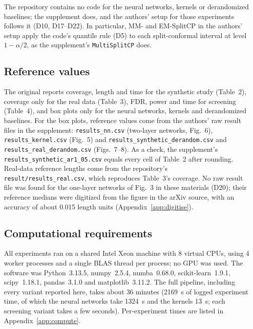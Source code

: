 The repository contains no code for the neural networks, kernels or derandomized baselines; the supplement does,
and the authors' setup for those experiments follows it (D10, D17--D22). In particular, MM- and EM-SplitCP in the
authors' setup apply the code's quantile rule (D5) to each split-conformal interval at level $1-\alpha/2$, as the
supplement's \texttt{MultiSplitCP} does.

\subsection{Reference values}

The original reports coverage, length and time for the synthetic study (Table~2), coverage only for the real data
(Table~3), FDR, power and time for screening (Table~4), and box plots only for the neural networks, kernels and
derandomized baselines. For the box plots, reference values come from the authors' raw result files in the
supplement\supercite{leezhang2025supp}: \texttt{results\_\allowbreak nn.csv} (two-layer networks, Fig.~6),
\texttt{results\_\allowbreak kernel.csv} (Fig.~5) and \texttt{results\_\allowbreak synthetic\_derandom.csv} and
\texttt{results\_\allowbreak real\_derandom.csv} (Figs.~7--8). As a check, the supplement's
\texttt{results\_\allowbreak synthetic\_ar1\_05.csv} equals every cell of Table~2 after rounding. Real-data reference lengths come from the repository's
\texttt{result/\allowbreak results\_\allowbreak real.csv}\supercite{authorscode}, which reproduces Table~3's
coverage. No raw result file was found for the one-layer networks of Fig.~3 in these materials (D20); their reference medians were digitized
from the figure in the arXiv source, with an accuracy of about 0.015 length units (Appendix~\ref{app:digitise}).

\subsection{Computational requirements}

All experiments ran on a shared Intel Xeon machine with 8 virtual CPUs, using 4 worker processes and a single BLAS
thread per process; no GPU was used. The software was Python~3.13.5, numpy~2.5.4, numba~0.68.0,
scikit-learn~1.9.1, scipy~1.18.1, pandas~3.1.0 and matplotlib~3.11.2. The full pipeline, including every variant
reported here, takes about 36 minutes (2169~s of logged experiment time, of which the neural networks take 1324~s
and the kernels 13~s; each screening variant takes a few seconds). Per-experiment times are listed in Appendix~\ref{app:compute}.

